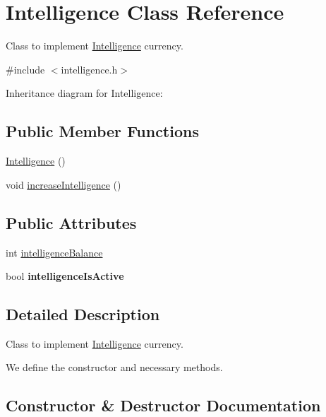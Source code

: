 \hypertarget{classIntelligence}{}\section{Intelligence Class Reference}
\label{classIntelligence}


Class to implement \hyperlink{classIntelligence}{Intelligence} currency.  




{\ttfamily \#include $<$intelligence.\+h$>$}



Inheritance diagram for Intelligence\+:
\subsection*{Public Member Functions}
\begin{DoxyCompactItemize}
\item 
\hyperlink{classIntelligence_a146fc36901bb5993c71b0d9426439fea}{Intelligence} ()
\item 
void \hyperlink{classIntelligence_ad822db7ef4eef6c1f797f65c73fec3f0}{increase\+Intelligence} ()
\end{DoxyCompactItemize}
\subsection*{Public Attributes}
\begin{DoxyCompactItemize}
\item 
int \hyperlink{classIntelligence_a20fc418262dd34db0d9e99d81d6a7544}{intelligence\+Balance}
\item 
\mbox{\label{classIntelligence_ad8d4fda31beb86dc434f71fe6c683ae9}} 
bool {\bfseries intelligence\+Is\+Active}
\end{DoxyCompactItemize}


\subsection{Detailed Description}
Class to implement \hyperlink{classIntelligence}{Intelligence} currency. 

We define the constructor and necessary methods. 

\subsection{Constructor \& Destructor Documentation}
\mbox{\label{classIntelligence_a146fc36901bb5993c71b0d9426439fea}} 
